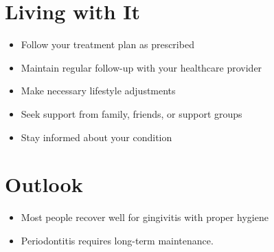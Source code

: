 \section{Living with It}
\begin{itemize}[noitemsep]
  \item Follow your treatment plan as prescribed
  \item Maintain regular follow-up with your healthcare provider
  \item Make necessary lifestyle adjustments
  \item Seek support from family, friends, or support groups
  \item Stay informed about your condition
\end{itemize}
\section{Outlook}
\begin{itemize}[noitemsep]
  \item Most people recover well for gingivitis with proper hygiene
  \item Periodontitis requires long-term maintenance.
\end{itemize}
